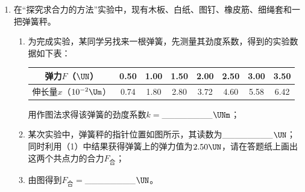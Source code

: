 \documentclass[\gkver]{gaokaozhenti}
\begin{document}
\begin{enumerate}
{\begin{enumerate}
	\item
	$1.51$（$1.48\sim1.54$）

	\item
	A

\end{enumerate}
}

\item
在“探究求合力的方法”实验中，现有木板、白纸、图钉、橡皮筋、细绳套和一把弹簧秤。
\begin{enumerate}
	\item
	为完成实验，某同学另找来一根弹簧，先测量其劲度系数，得到的实验数据如下表：

\begin{center}
\begin{tabular}{|c|c|c|c|c|c|c|c|}
\hline
弹力$F$（$\UN$） & 0.50 & 1.00 & 1.50 & 2.00 & 2.50 & 3.00 & 3.50 \\
\hline
伸长量$x$（$10^{-2}\Um$） & 0.74 & 1.80 & 2.80 & 3.72 & 4.60 & 5.58 & 6.42 \\
\hline
\end{tabular}
\end{center}

	用作图法求得该弹簧的劲度系数$k=$\_\_\_\_\_\_\_\_$\UNm$；
	\item
	某次实验中，弹簧秤的指针位置如图所示，其读数为\_\_\_\_\_\_\_\_$\UN$；同时利用（1）中结果获得弹簧上的弹力值为$2.50\UN$，请在答题纸上画出这两个共点力的合力$F_{\text{合}}$；
	\item
	由图得到$F_{\text{合}}=$\_\_\_\_\_\_\_\_$\UN$。
\end{enumerate}
\end{enumerate}
\end{document}
